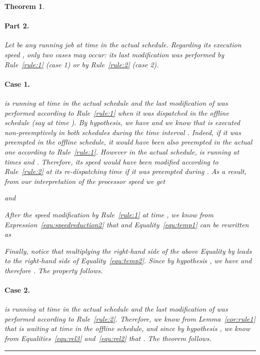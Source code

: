 \documentclass[times, 10pt,twocolumn]{article}
\newtheorem{Theorem}{Theorem}
\newenvironment{proof}[1][Proof]{\begin{trivlist}
\item[\hskip \labelsep {\bfseries #1}]}{\end{trivlist}}
\newcommand{\qed}{\rule{7pt}{7pt}}
\begin{document}
\begin{Theorem}
\begin{proof}
\paragraph{Part 2.} Let  be any running job at time  in the actual schedule. Regarding its execution speed , only two cases may occur: its last modification was performed by Rule~\ref{rule:1} (case 1) or by Rule~\ref{rule:2} (case 2).

\paragraph{Case 1.}  is running at time  in the actual schedule and the last modification of  was performed according to Rule~\ref{rule:1} when it was dispatched in the offline schedule (say at time ). By hypothesis, we have  and we know that  is executed non-preemptively in both schedules during the time interval . Indeed, if it was preempted in the offline schedule, it would have been also preempted in the actual one according to Rule~\ref{rule:1}. However in the actual schedule,  is running at times  and . Therefore, its speed would have been modified according to Rule~\ref{rule:2} at its re-dispatching time if it was preempted during . As a result, from our interpretation of the processor speed we get
\begin{small}

\end{small}
and
\begin{small}

\end{small}

\noindent After the speed modification by Rule~\ref{rule:1} at time , we know from Expression~\ref{equ:speedreduction2} that  and Equality~\ref{equ:temp1} can be rewritten as
\begin{scriptsize}

\end{scriptsize}

\noindent Finally, notice that multiplying the right-hand side of the above Equality by  leads to the right-hand side of Equality~\ref{equ:temp2}. Since by hypothesis , we have  and therefore . The property follows.

\paragraph{Case 2.}  is running at time  in the actual schedule and the last modification of  was performed according to Rule~\ref{rule:2}. Therefore, we know from Lemma~\ref{cor:rule1} that  is waiting at time  in the offline schedule, and since by hypothesis , we know from Equalities~\ref{equ:rel3} and~\ref{equ:rel2} that . The theorem follows. \hfill\qed
\end{proof}
\end{Theorem}
\end{document}
